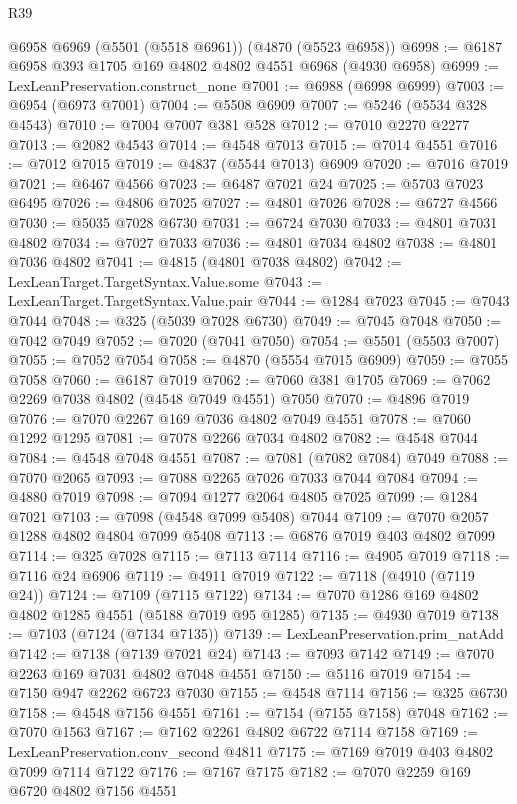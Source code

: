 \begin{lexlean}{R39}
\begin{coremodule}
    @6958
    @6969
    (@5501 (@5518 @6961))
    (@4870 (@5523 @6958))
@6998 := @6187 @6958 @393 @1705 @169 @4802 @4802 @4551 @6968 (@4930 @6958)
@6999 := LexLeanPreservation.construct_none
@7001 := @6988 (@6998 @6999)
@7003 := @6954 (@6973 @7001)
@7004 := @5508 @6909
@7007 := @5246 (@5534 @328 @4543)
@7010 := @7004 @7007 @381 @528
@7012 := @7010 @2270 @2277
@7013 := @2082 @4543
@7014 := @4548 @7013
@7015 := @7014 @4551
@7016 := @7012 @7015
@7019 := @4837 (@5544 @7013) @6909
@7020 := @7016 @7019
@7021 := @6467 @4566
@7023 := @6487 @7021 @24
@7025 := @5703 @7023 @6495
@7026 := @4806 @7025
@7027 := @4801 @7026
@7028 := @6727 @4566
@7030 := @5035 @7028 @6730
@7031 := @6724 @7030
@7033 := @4801 @7031 @4802
@7034 := @7027 @7033
@7036 := @4801 @7034 @4802
@7038 := @4801 @7036 @4802
@7041 := @4815 (@4801 @7038 @4802)
@7042 := LexLeanTarget.TargetSyntax.Value.some
@7043 := LexLeanTarget.TargetSyntax.Value.pair
@7044 := @1284 @7023
@7045 := @7043 @7044
@7048 := @325 (@5039 @7028 @6730)
@7049 := @7045 @7048
@7050 := @7042 @7049
@7052 := @7020 (@7041 @7050)
@7054 := @5501 (@5503 @7007)
@7055 := @7052 @7054
@7058 := @4870 (@5554 @7015 @6909)
@7059 := @7055 @7058
@7060 := @6187 @7019
@7062 := @7060 @381 @1705
@7069 := @7062 @2269 @7038 @4802 (@4548 @7049 @4551) @7050
@7070 := @4896 @7019
@7076 := @7070 @2267 @169 @7036 @4802 @7049 @4551
@7078 := @7060 @1292 @1295
@7081 := @7078 @2266 @7034 @4802
@7082 := @4548 @7044
@7084 := @4548 @7048 @4551
@7087 := @7081 (@7082 @7084) @7049
@7088 := @7070 @2065
@7093 := @7088 @2265 @7026 @7033 @7044 @7084
@7094 := @4880 @7019
@7098 := @7094 @1277 @2064 @4805 @7025
@7099 := @1284 @7021
@7103 := @7098 (@4548 @7099 @5408) @7044
@7109 := @7070 @2057 @1288 @4802 @4804 @7099 @5408
@7113 := @6876 @7019 @403 @4802 @7099
@7114 := @325 @7028
@7115 := @7113 @7114
@7116 := @4905 @7019
@7118 := @7116 @24 @6906
@7119 := @4911 @7019
@7122 := @7118 (@4910 (@7119 @24))
@7124 := @7109 (@7115 @7122)
@7134 := @7070 @1286 @169 @4802 @4802 @1285 @4551 (@5188 @7019 @95 @1285)
@7135 := @4930 @7019
@7138 := @7103 (@7124 (@7134 @7135))
@7139 := LexLeanPreservation.prim_natAdd
@7142 := @7138 (@7139 @7021 @24)
@7143 := @7093 @7142
@7149 := @7070 @2263 @169 @7031 @4802 @7048 @4551
@7150 := @5116 @7019
@7154 := @7150 @947 @2262 @6723 @7030
@7155 := @4548 @7114
@7156 := @325 @6730
@7158 := @4548 @7156 @4551
@7161 := @7154 (@7155 @7158) @7048
@7162 := @7070 @1563
@7167 := @7162 @2261 @4802 @6722 @7114 @7158
@7169 := LexLeanPreservation.conv_second @4811
@7175 := @7169 @7019 @403 @4802 @7099 @7114 @7122
@7176 := @7167 @7175
@7182 := @7070 @2259 @169 @6720 @4802 @7156 @4551

\end{coremodule}
\end{lexlean}

